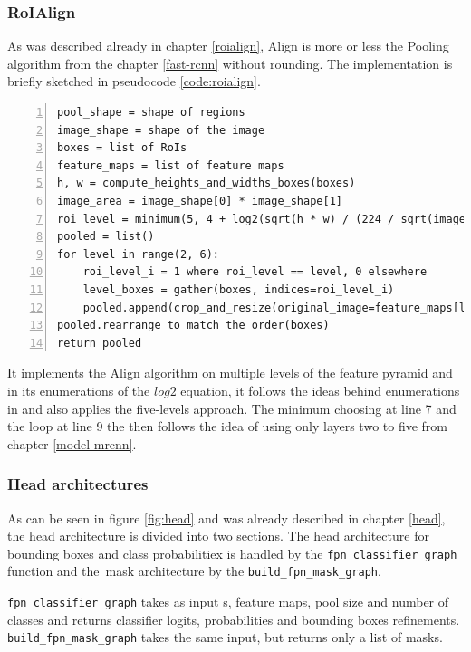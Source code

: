 \subsubsection{RoIAlign}
\label{model-roi}

As was described already in chapter \ref{roialign}, Align is more or 
less the Pooling algorithm from the chapter \ref{fast-rcnn} without 
rounding. The implementation is briefly sketched in pseudocode 
\ref{code:roialign}.

{\scriptsize
\begin{lstlisting}[style=python, caption={RoIAlign}, captionpos=b, 
label=code:roialign, deletekeywords={from, input, map},
backgroundcolor = \color{light-gray}, numbers=left, breaklines=true]
pool_shape = shape of regions
image_shape = shape of the image
boxes = list of RoIs
feature_maps = list of feature maps
h, w = compute_heights_and_widths_boxes(boxes)
image_area = image_shape[0] * image_shape[1]
roi_level = minimum(5, 4 + log2(sqrt(h * w) / (224 / sqrt(image_area))))
pooled = list()
for level in range(2, 6):
    roi_level_i = 1 where roi_level == level, 0 elsewhere
    level_boxes = gather(boxes, indices=roi_level_i)
    pooled.append(crop_and_resize(original_image=feature_maps[level-2], what_process=level_boxes, shape=pool_shape, method='bilinear'))
pooled.rearrange_to_match_the_order(boxes)
return pooled
\end{lstlisting}}

It implements the Align algorithm on multiple levels of the feature 
pyramid and in its enumerations of the $log2$ equation, it follows the ideas 
behind enumerations in \cite{fpn} and also applies the five-levels approach. The 
minimum choosing at line 7 and the loop at line 9 the then follows the idea of 
using only layers two to five from chapter \ref{model-mrcnn}.

\subsubsection{Head architectures}
\label{model-head}

As can be seen in figure \ref{fig:head} and was already described in chapter 
\ref{head}, the head architecture is divided into two sections. The head 
architecture for bounding boxes and class probabilitiex is handled by the 
\verb|fpn_classifier_graph| function and the~mask architecture by the 
\verb|build_fpn_mask_graph|.

\verb|fpn_classifier_graph| takes as input s, feature maps, pool size 
and number of classes and returns classifier logits, probabilities and bounding 
boxes refinements. \verb|build_fpn_mask_graph| takes the same input, but returns 
only a list of masks.

